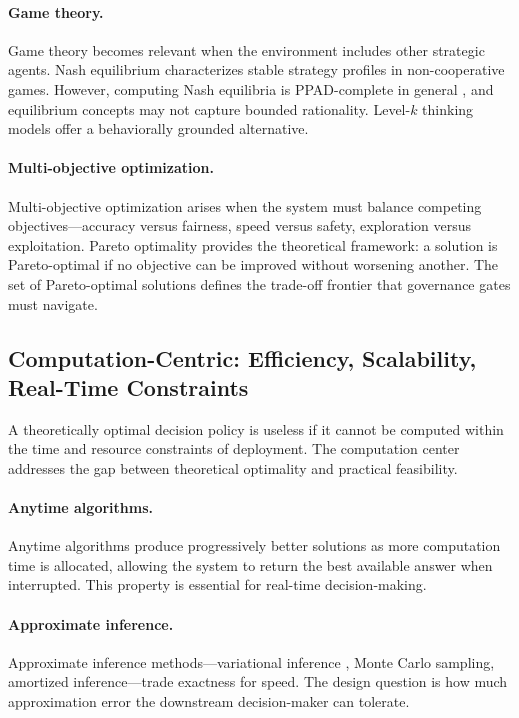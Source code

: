 \documentclass[11pt,a4paper]{article}
\begin{document}
\paragraph{Game theory.} Game theory becomes relevant when the environment includes other strategic agents. Nash equilibrium \citep{nash1950equilibrium} characterizes stable strategy profiles in non-cooperative games. However, computing Nash equilibria is PPAD-complete in general \citep{daskalakis2009complexity}, and equilibrium concepts may not capture bounded rationality. Level-$k$ thinking models \citep{stahl1994experimental} offer a behaviorally grounded alternative.

\paragraph{Multi-objective optimization.} Multi-objective optimization arises when the system must balance competing objectives---accuracy versus fairness, speed versus safety, exploration versus exploitation. Pareto optimality provides the theoretical framework: a solution is Pareto-optimal if no objective can be improved without worsening another. The set of Pareto-optimal solutions defines the trade-off frontier that governance gates must navigate.

\subsection{Computation-Centric: Efficiency, Scalability, Real-Time Constraints}

A theoretically optimal decision policy is useless if it cannot be computed within the time and resource constraints of deployment. The computation center addresses the gap between theoretical optimality and practical feasibility.

\paragraph{Anytime algorithms.} Anytime algorithms \citep{zilberstein1996anytime} produce progressively better solutions as more computation time is allocated, allowing the system to return the best available answer when interrupted. This property is essential for real-time decision-making.

\paragraph{Approximate inference.} Approximate inference methods---variational inference \citep{blei2017variational}, Monte Carlo sampling, amortized inference---trade exactness for speed. The design question is how much approximation error the downstream decision-maker can tolerate.
\end{document}
